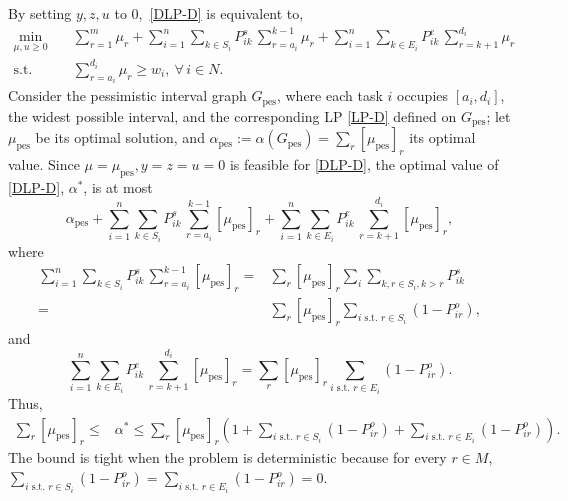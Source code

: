 \documentclass{article}
\DeclareMathOperator{\pes}{pes}
\begin{document}
\noindent
By setting $y,z, u$ to $0$,~\eqref{DLP-D} is equivalent to,
\begin{align*}
\tag{LP-Dpes}
\label{LP-Dpes}
\min_{\mu,u\geq 0}\quad 
& \sum_{r=1}^{m} \mu_r
  + \sum_{i=1}^{n}\sum_{k\in S_i} P^s_{ik}\,\sum_{r=a_i}^{k-1} \mu_r
  + \sum_{i=1}^{n}\sum_{k\in E_i} P^e_{ik}\,\sum_{r=k+1}^{d_i} \mu_r\\
\text{s.t.}\quad 
&\sum_{r=a_i}^{d_i} \mu_r \geq w_i,
~\forall\, i\in N.
\end{align*}
Consider the pessimistic interval graph $G_{\pes}$, where each task $i$ occupies $[a_i,d_i]$, the widest possible interval, and the corresponding LP \eqref{LP-D} defined on $G_{\pes}$; 
let $\mu_{\pes}$ be its optimal solution, and $\alpha_{\pes}:=\alpha(G_{\pes})=\sum_{r}[\mu_{\pes}]_r$ its optimal value.
Since $\mu = \mu_{\pes}, y=z=u=0$ is feasible for \eqref{DLP-D}, the optimal value of \eqref{DLP-D}, $\alpha^*$, is at most \[\alpha_{\pes}+\sum_{i=1}^{n}\sum_{k\in S_i} P^s_{ik}\,\sum_{r=a_i}^{k-1} {[\mu_{\pes}]}_r
  + \sum_{i=1}^{n}\sum_{k\in E_i} P^e_{ik}\,\sum_{r=k+1}^{d_i} {[\mu_{\pes}]}_r,\] where
\begin{align*}
\sum_{i=1}^{n}\sum_{k\in S_i} P^s_{ik}\, \sum_{r=a_i}^{k-1}{[\mu_{\pes}]}_r = & \sum_{r}{[\mu_{\pes}]}_r\sum_{i}\sum_{k,r\in S_i, k>r}P_{ik}^s\\
=&\sum_r {[\mu_{\pes}]}_r \sum_{i\text{ s.t. }r\in S_i} (1-P_{ir}^o),
\end{align*}
and
\[\sum_{i=1}^{n}\sum_{k\in E_i} P^e_{ik}\,\sum_{r=k+1}^{d_i} {[\mu_{\pes}]}_r= \sum_{r}{[\mu_{\pes}]}_r\sum_{i\text{ s.t. }r\in E_i}(1-P_{ir}^o).\]
Thus,
\begin{align*}
\sum_r [\mu_{\pes}]_r\leq & \alpha^*\leq\sum_r [\mu_{\pes}]_r\left(1+\sum_{i\text{ s.t. }r\in S_i} (1-P_{ir}^o)+\sum_{i\text{ s.t. }r\in E_i} (1-P_{ir}^o)\right).
\end{align*}
The bound is tight when the problem is deterministic because for every $r\in M$, $\sum_{i\text{ s.t. }r\in S_i} (1-P_{ir}^o) = \sum_{i\text{ s.t. }r\in E_i} (1-P_{ir}^o) = 0$.
\end{document}
